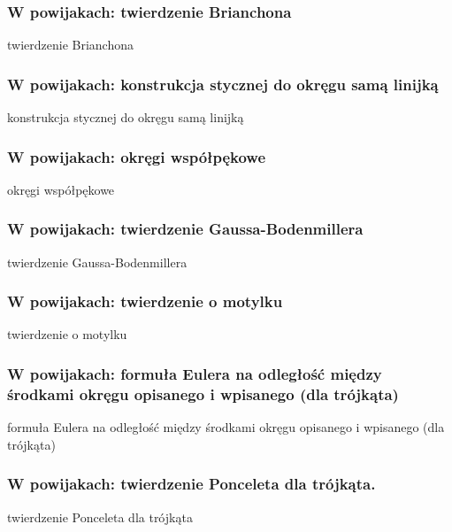 \subsubsection{W powijakach: twierdzenie Brianchona}
twierdzenie Brianchona

\subsubsection{W powijakach: konstrukcja stycznej do okręgu samą linijką}
konstrukcja stycznej do okręgu samą linijką

\subsubsection{W powijakach: okręgi współpękowe}
okręgi współpękowe

\subsubsection{W powijakach: twierdzenie Gaussa-Bodenmillera}
twierdzenie Gaussa-Bodenmillera

\subsubsection{W powijakach: twierdzenie o motylku}
twierdzenie o motylku

\subsubsection{W powijakach: formuła Eulera na odległość między środkami okręgu opisanego i wpisanego (dla trójkąta)}
formuła Eulera na odległość między środkami okręgu opisanego i wpisanego (dla trójkąta)

\subsubsection{W powijakach: twierdzenie Ponceleta dla trójkąta.}
twierdzenie Ponceleta dla trójkąta
